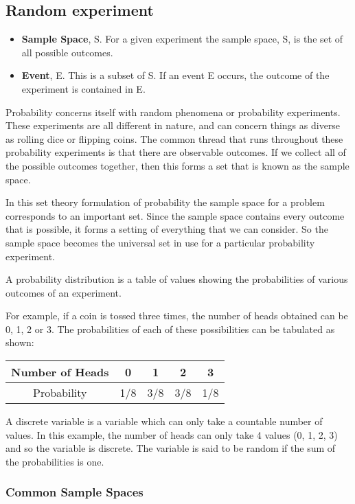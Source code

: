 \documentclass[12pt]{article}
\begin{document}
\subsection{Random experiment}
\begin{itemize}
\item \textbf{Sample Space}, S. For a given experiment the sample space, S, is the set of all
possible outcomes.
\item \textbf{Event}, E. This is a subset of S. If an event E occurs, the outcome of the experiment is contained in E.
\end{itemize}

Probability concerns itself with random phenomena or probability experiments. These experiments are all different in nature, and can concern things as diverse as rolling dice or flipping coins. The common thread that runs throughout these probability experiments is that there are observable outcomes. If we collect all of the possible outcomes together, then this forms a set that is known as the sample space.

In this set theory formulation of probability the sample space for a problem corresponds to an important set. Since the sample space contains every outcome that is possible, it forms a setting of everything that we can consider. So the sample space becomes the universal set in use for a particular probability experiment.

A probability distribution is a table of values showing the probabilities of various outcomes of an experiment.

For example, if a coin is tossed three times, the number of heads obtained can be 0, 1, 2 or 3. The probabilities of each of these possibilities can be tabulated as shown:

\begin{tabular}{|c|c|c|c|c|}
\hline Number of Heads & 0 & 1 & 2 & 3 \\ 
\hline Probability & 1/8  & 3/8  & 3/8 & 1/8 \\ 
\hline 
\end{tabular} 

A discrete variable is a variable which can only take a countable number of values. In this example, the number of heads can only take 4 values (0, 1, 2, 3) and so the variable is discrete. The variable is said to be random if the sum of the probabilities is one. 


\subsubsection{Common Sample Spaces}
\end{document}

